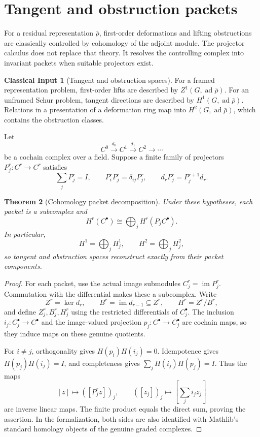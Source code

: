 \documentclass[11pt]{article}
\newtheorem{theorem}{Theorem}[section]
\theoremstyle{definition}
\newtheorem{classicalinput}[theorem]{Classical Input}
\theoremstyle{remark}
\newcommand{\ad}{\operatorname{ad}}
\begin{document}
\section{Tangent and obstruction packets}

For a residual representation \(\bar\rho\), first-order deformations and lifting obstructions are classically controlled by cohomology of the adjoint module.  The projector calculus does not replace that theory.  It resolves the controlling complex into invariant packets when suitable projectors exist.

\begin{classicalinput}[Tangent and obstruction spaces]\label{px:4.1}
For a framed representation problem, first-order lifts are described by \(Z^1(G,\ad\bar\rho)\).  For an unframed Schur problem, tangent directions are described by \(H^1(G,\ad\bar\rho)\).  Relations in a presentation of a deformation ring map into \(H^2(G,\ad\bar\rho)\), which contains the obstruction classes.
\end{classicalinput}

Let
\[
C^0\xrightarrow{d_0}C^1\xrightarrow{d_1}C^2\xrightarrow{}\cdots
\]
be a cochain complex over a field.  Suppose a finite family of projectors \(P_j^r:C^r\to C^r\) satisfies
\[
\sum_jP_j^r=I,
\qquad
P_i^rP_j^r=\delta_{ij}P_j^r,
\qquad
d_rP_j^r=P_j^{r+1}d_r.
\]

\begin{theorem}[Cohomology packet decomposition]\label{px:4.2}
Under these hypotheses, each packet is a subcomplex and
\[
\boxed{
H^r(C^\bullet)
\cong
\bigoplus_jH^r(P_jC^\bullet).
}
\]
In particular,
\[
H^1=\bigoplus_jH^1_j,
\qquad
H^2=\bigoplus_jH^2_j,
\]
so tangent and obstruction spaces reconstruct exactly from their packet components.
\end{theorem}

\begin{proof}
For each packet, use the actual image submodules
\(C_j^r=\operatorname{im}P_j^r\). Commutation with the differential
makes these a subcomplex. Write
\[
Z^r=\ker d_r,\qquad B^r=\operatorname{im}d_{r-1}\subseteq Z^r,
\qquad H^r=Z^r/B^r,
\]
and define \(Z_j^r,B_j^r,H_j^r\) using the restricted differentials of
\(C_j^\bullet\). The inclusion \(i_j:C_j^\bullet\to C^\bullet\)
and the image-valued projection \(p_j:C^\bullet\to C_j^\bullet\)
are cochain maps, so they induce maps on these genuine quotients.

For \(i\ne j\), orthogonality gives
\(H(p_i)H(i_j)=0\). Idempotence gives
\(H(p_j)H(i_j)=I\), and completeness gives
\(\sum_j H(i_j)H(p_j)=I\). Thus the maps
\[
[z]\longmapsto([P_j^r z])_j,
\qquad
([z_j])_j\longmapsto\left[\sum_j i_j z_j\right]
\]
are inverse linear maps. The finite product equals the direct sum, proving
the assertion. In the formalization, both sides are also identified with
Mathlib's standard homology objects of the genuine graded complexes.
\end{proof}
\end{document}
